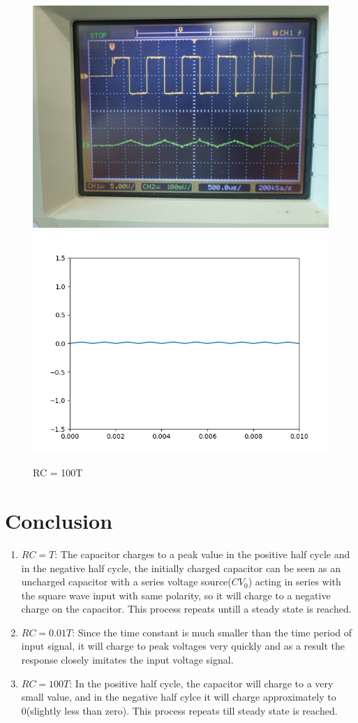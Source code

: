 \documentclass[a4paper,12pt]{article}
\begin{document}
\begin{figure}[!htb]
  {\includegraphics[width=0.5\columnwidth]{figs/RC=100T_exp.jpg}}
  \hspace{\fill}
  {\includegraphics[width=0.5\columnwidth]{figs/RC=100T_sim.png}}
  \caption{RC = 100T}
\end{figure}
	\section{Conclusion}
\begin{enumerate}
  \item $RC = T$: The capacitor charges to a peak value in the positive half cycle and in the negative half cycle, the initially charged capacitor can be seen as an uncharged capacitor with a series voltage source($CV_0$) acting in series with the square wave input with same polarity, so it will charge to a negative charge on the capacitor. This process repeats untill a steady state is reached.
  \item $RC = 0.01T$: Since the time constant is much smaller than the time period of input signal, it will charge to peak voltages very quickly and as a result the response closely imitates the input voltage signal. 
  \item $RC = 100T$: In the positive half cycle, the capacitor will charge to a very small value, and in the negative half cylce it will charge approximately to 0(slightly less than zero). This process repeats till steady state is reached.
\end{enumerate}
\end{document}
